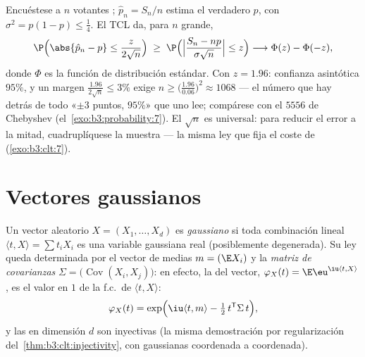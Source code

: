 \begin{example}
\label{ex:b3:clt:confidence}
Encuéstese a $n$ votantes
;
$\hat p_n = S_n/n$ estima el verdadero $p$, con
$\sigma^2 = p(1-p) \leq \frac14$. El TCL da, para $n$ grande,
\[
\P\Bigl(\abs{\hat p_n - p} \leq
\frac{z}{2\sqrt n}\Bigr)
\;\geq\; \P\Bigl(\Bigl|\frac{S_n - np}{\sigma\sqrt n}\Bigr|
\leq z\Bigr)
\longrightarrow \Phi(z) - \Phi(-z),
\]
donde $\Phi$ es la función de distribución
 estándar. Con $z = 1.96$:
confianza asintótica $95\%$, y un margen
$\frac{1.96}{2\sqrt n} \leq 3\%$ exige $n \geq
\bigl(\frac{1.96}{0.06}\bigr)^2 \approx 1068$ --- el número que hay
detrás de todo «$\pm3$ puntos, $95\%$» que uno lee; compárese con el
$5556$ de Chebyshev (el~\cref{exo:b3:probability:7}). El $\sqrt n$ es
universal: para reducir el error a la mitad, cuadruplíquese la muestra
--- la misma ley que fija el coste de
(\cref{exo:b3:clt:7}).
\end{example}

\section{Vectores gaussianos}

\begin{definition}\label{def:b3:clt:gaussianvector}
Un vector aleatorio $X = (X_1, \dots, X_d)$ es
\emph{gaussiano} si toda combinación lineal
$\langle t, X\rangle = \sum t_iX_i$ es una variable gaussiana real
(posiblemente degenerada). Su ley queda determinada por el vector de
medias $m = (\E X_i)$ y la \emph{matriz de covarianzas}
$\Sigma = \bigl(\operatorname{Cov}
(X_i, X_j)\bigr)$: en efecto, la  del vector,
$\varphi_X(t) = \E\eu^{\iu\langle t, X\rangle}$, es el valor en $1$ de
la f.c.\ de $\langle t, X\rangle$:
\[
\varphi_X(t) = \exp\Bigl(\iu\langle t, m\rangle -
\tfrac12\,t^{\mathsf T}\Sigma\,t\Bigr),
\]
y las  en dimensión $d$
son inyectivas (la misma demostración por regularización
del~\cref{thm:b3:clt:injectivity}, con gaussianas coordenada a
coordenada).
\end{definition}

